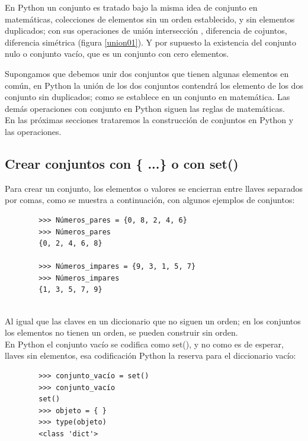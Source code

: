 	En Python un conjunto es tratado bajo la misma idea de conjunto en matemáticas, colecciones de elementos sin un orden establecido, y sin elementos duplicados; con sus operaciones de unión intersección , diferencia de cojuntos, diferencia simétrica (figura \ref{union01}). Y por supuesto la existencia del conjunto nulo o conjunto vacío, que es un conjunto con cero elementos. 
	
	Supongamos que debemos unir dos conjuntos que tienen algunas elementos en común, en Python la unión de los dos conjuntos contendrá los elemento de los dos conjunto sin duplicados; como se establece en un conjunto en  matemática. Las demás operaciones con conjunto en Python siguen las reglas de matemáticas. \\
	
	En las próximas secciones trataremos la construcción de conjuntos en Python y las operaciones. 
	
	
	\subsection{Crear conjuntos con  \{ ...\} o con set()}
	
	Para crear un conjunto, los elementos  o valores se encierran entre llaves separados por comas, como se muestra a continuación, con algunos ejemplos de conjuntos: 
	\begin{lstlisting}
		>>> Números_pares = {0, 8, 2, 4, 6}
		>>> Números_pares
		{0, 2, 4, 6, 8}
		
		>>> Números_impares = {9, 3, 1, 5, 7}
		>>> Números_impares
		{1, 3, 5, 7, 9}
		
	\end{lstlisting}
	
	Al igual que las claves en un diccionario que no siguen un orden;  en los conjuntos los elementos no tienen un orden, se pueden construir sin orden.\\
	
	
	En Python el conjunto vacío se codifica como {\ttfamily set()}, y no como es de esperar, llaves sin elementos, esa codificación Python la reserva para el diccionario vacío: 
	
	\begin{lstlisting}
		>>> conjunto_vacío = set()
		>>> conjunto_vacío
		set()
		>>> objeto = { }
		>>> type(objeto)
		<class 'dict'>
	\end{lstlisting}
	
